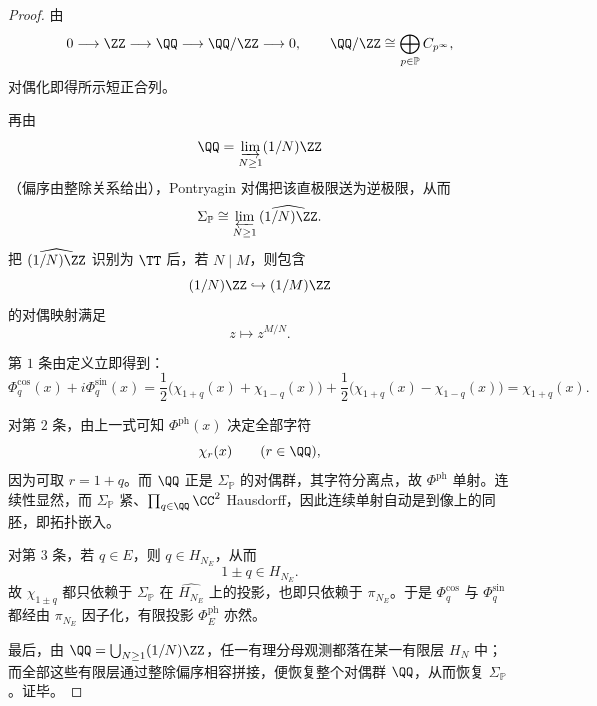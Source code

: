 \begin{proof}
由
\[
0\longrightarrow \ZZ\longrightarrow \QQ\longrightarrow \QQ/\ZZ\longrightarrow 0,
\qquad
\QQ/\ZZ\cong \bigoplus_{p\in\mathbb P}C_{p^\infty},
\]
对偶化即得所示短正合列。

再由
\[
\QQ=\varinjlim_{N\ge 1}(1/N)\ZZ
\]
（偏序由整除关系给出），Pontryagin 对偶把该直极限送为逆极限，从而
\[
\Sigma_{\mathbb P}
\cong
\varprojlim_{N\ge 1}\widehat{(1/N)\ZZ}.
\]
把 \(\widehat{(1/N)\ZZ}\) 识别为 \(\TT\) 后，若 \(N\mid M\)，则包含
\[
(1/N)\ZZ\hookrightarrow (1/M)\ZZ
\]
的对偶映射满足
\[
z\longmapsto z^{M/N}.
\]

第 \(1\) 条由定义立即得到：
\[
\Phi_q^{\cos}(x)+i\Phi_q^{\sin}(x)
=
\frac12\bigl(\chi_{1+q}(x)+\chi_{1-q}(x)\bigr)
+\frac12\bigl(\chi_{1+q}(x)-\chi_{1-q}(x)\bigr)
=
\chi_{1+q}(x).
\]

对第 \(2\) 条，由上一式可知 \(\Phi^{\mathrm{ph}}(x)\) 决定全部字符
\[
\chi_r(x)
\qquad (r\in\QQ),
\]
因为可取 \(r=1+q\)。而 \(\QQ\) 正是 \(\Sigma_{\mathbb P}\) 的对偶群，其字符分离点，故 \(\Phi^{\mathrm{ph}}\) 单射。连续性显然，而 \(\Sigma_{\mathbb P}\) 紧、\(\prod_{q\in\QQ}\CC^2\) Hausdorff，因此连续单射自动是到像上的同胚，即拓扑嵌入。

对第 \(3\) 条，若 \(q\in E\)，则 \(q\in H_{N_E}\)，从而
\[
1\pm q\in H_{N_E}.
\]
故 \(\chi_{1\pm q}\) 都只依赖于 \(\Sigma_{\mathbb P}\) 在 \(\widehat{H_{N_E}}\) 上的投影，也即只依赖于 \(\pi_{N_E}\)。于是 \(\Phi_q^{\cos}\) 与 \(\Phi_q^{\sin}\) 都经由 \(\pi_{N_E}\) 因子化，有限投影 \(\Phi_E^{\mathrm{ph}}\) 亦然。

最后，由 \(\QQ=\bigcup_{N\ge 1}(1/N)\ZZ\)，任一有理分母观测都落在某一有限层 \(H_N\) 中；而全部这些有限层通过整除偏序相容拼接，便恢复整个对偶群 \(\QQ\)，从而恢复 \(\Sigma_{\mathbb P}\)。证毕。
\end{proof}

